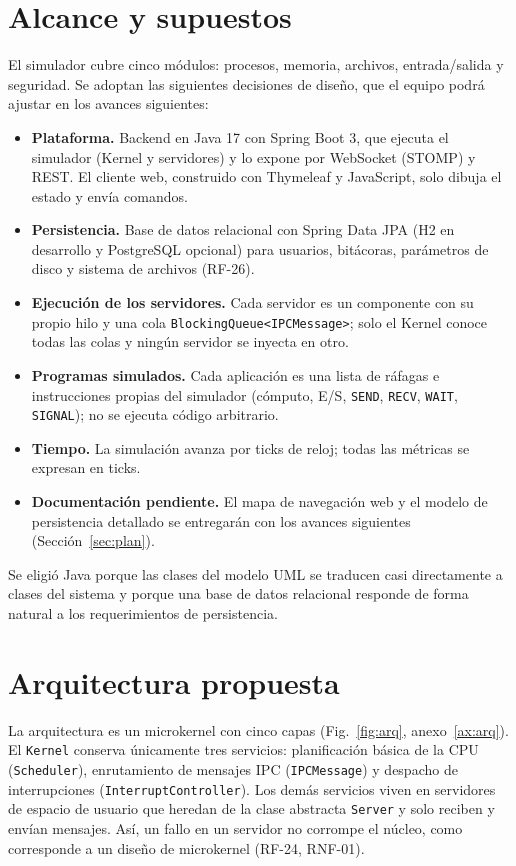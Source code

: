\documentclass[conference]{IEEEtran}
\begin{document}
\section{Alcance y supuestos}\label{sec:alcance}
El simulador cubre cinco módulos: procesos, memoria, archivos, entrada/salida y seguridad. Se adoptan las siguientes decisiones de diseño, que el equipo podrá ajustar en los avances siguientes:
\begin{itemize}
\item \textbf{Plataforma.} Backend en Java 17 con Spring Boot 3, que ejecuta el simulador (Kernel y servidores) y lo expone por WebSocket (STOMP) y REST. El cliente web, construido con Thymeleaf y JavaScript, solo dibuja el estado y envía comandos.
\item \textbf{Persistencia.} Base de datos relacional con Spring Data JPA (H2 en desarrollo y PostgreSQL opcional) para usuarios, bitácoras, parámetros de disco y sistema de archivos (RF-26).
\item \textbf{Ejecución de los servidores.} Cada servidor es un componente con su propio hilo y una cola \texttt{BlockingQueue<IPCMessage>}; solo el Kernel conoce todas las colas y ningún servidor se inyecta en otro.
\item \textbf{Programas simulados.} Cada aplicación es una lista de ráfagas e instrucciones propias del simulador (cómputo, E/S, \texttt{SEND}, \texttt{RECV}, \texttt{WAIT}, \texttt{SIGNAL}); no se ejecuta código arbitrario.
\item \textbf{Tiempo.} La simulación avanza por ticks de reloj; todas las métricas se expresan en ticks.
\item \textbf{Documentación pendiente.} El mapa de navegación web y el modelo de persistencia detallado se entregarán con los avances siguientes (Sección~\ref{sec:plan}).
\end{itemize}
Se eligió Java porque las clases del modelo UML se traducen casi directamente a clases del sistema y porque una base de datos relacional responde de forma natural a los requerimientos de persistencia.

\section{Arquitectura propuesta}\label{sec:arq}
La arquitectura es un microkernel con cinco capas (Fig.~\ref{fig:arq}, anexo~\ref{ax:arq}). El \texttt{Kernel} conserva únicamente tres servicios: planificación básica de la CPU (\texttt{Scheduler}), enrutamiento de mensajes IPC (\texttt{IPCMessage}) y despacho de interrupciones (\texttt{InterruptController}). Los demás servicios viven en servidores de espacio de usuario que heredan de la clase abstracta \texttt{Server} y solo reciben y envían mensajes. Así, un fallo en un servidor no corrompe el núcleo, como corresponde a un diseño de microkernel (RF-24, RNF-01).
\end{document}
